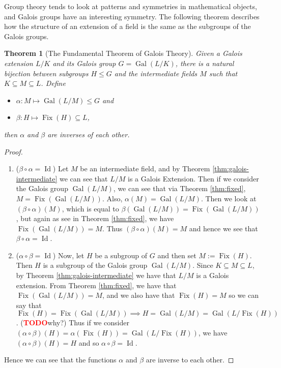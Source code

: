 \documentclass[12pt]{article}
\newtheorem{theorem}{Theorem}
\theoremstyle{definition}
\newcommand{\Gal}{\operatorname{Gal}}
\newcommand{\Fix}{\operatorname{Fix}}
\newcommand{\Id}{\operatorname{Id}}
\newcommand{\TODO}{\textbf{\textcolor{red}{TODO}}}
\begin{document}



Group theory tends to look at patterns and symmetries in mathematical objects, and Galois groups have an interesting symmetry. The following theorem describes how the structure of an extension of a field is the same as the subgroups of the Galois groups.

\begin{theorem}[The Fundamental Theorem of Galois Theory] \label{thm:fundamental-theorem} Given a Galois extension $L/K$ and its Galois group $G = \Gal(L/K)$, there is a natural bijection between subgroups $H\leq G$ and the intermediate fields $M$ such that $K \subseteq M \subseteq L$. Define

\begin{itemize}
    \item $\alpha:M \mapsto \Gal(L/M) \leq G$ and
    \item $\beta:H \mapsto \Fix(H) \subseteq L$,
\end{itemize}
then $\alpha$ and $\beta$ are inverses of each other.
\end{theorem}
\begin{proof}
\begin{enumerate}[label=(\roman*)]

 \item ($\beta \circ \alpha = \Id$) Let $M$ be an intermediate field, and by Theorem \ref{thm:galois-intermediate} we can see that $L/M$ is a Galois Extension. Then if we consider the Galois group $\Gal(L/M)$, we can see that via Theorem \ref{thm:fixed}, $M = \Fix(\Gal(L/M))$. Also, $\alpha(M) = \Gal(L/M)$. Then we look at $(\beta \circ \alpha)(M)$, which is equal to $\beta(\Gal(L/M)) = \Fix(\Gal(L/M))$, but again as see in Theorem \ref{thm:fixed}, we have $\Fix(\Gal(L/M)) = M$. Thus $(\beta \circ \alpha)(M) = M$ and hence we see that $\beta \circ \alpha = \Id$.

 \item ($\alpha \circ \beta = \Id$) Now, let $H$ be a subgroup of $G$ and then set $M :=\Fix(H)$. Then $H$ is a subgroup of the Galois group $\Gal(L/M)$. Since $K \subseteq M \subseteq L$, by Theorem \ref{thm:galois-intermediate} we have that $L/M$ is a Galois extension. From Theorem \ref{thm:fixed}, we have that $\Fix(\Gal(L/M))=M$, and we also have that $\Fix(H) = M$ so we can say that $\Fix(H)=\Fix(\Gal(L/M)) \implies H = \Gal(L/M) = \Gal(L/\Fix(H))$. (\TODO why?) Thus if we consider $(\alpha \circ \beta)(H) = \alpha(\Fix(H)) = \Gal(L/\Fix(H))$, we have $(\alpha \circ \beta)(H) = H$ and so $\alpha \circ \beta = \Id$.
\end{enumerate}
Hence we can see that the functions $\alpha$ and $\beta$ are inverse to each other.
\end{proof}
\end{document}
